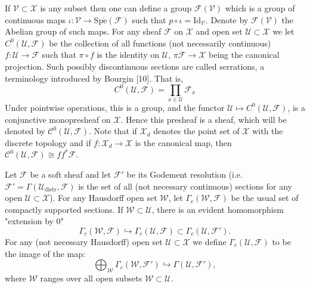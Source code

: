 \documentclass{beamer}
\theoremstyle{plain}
\newcommand{\be}{\begin{equation}}
\newcommand{\ee}{\end{equation}}
\newcommand{\Ga}{\Gamma}
\newcommand{\Id}{\mathrm{Id}}
\newcommand{\F}{\mathcal{F}}
\newcommand{\sF}{\mathcal{F}}       %
\newcommand{\sU}{\mathcal{U}}       %
\newcommand{\sV}{\mathcal{V}}       %
\newcommand{\sX}{\mathcal{X}}       %
\newcommand{\hookto}{\hookrightarrow}        %
\begin{document}
\begin{frame}
	If $\sV \subset \sX$ is any subset  then  one can define a group $\mathscr F\left(\sV\right)$  which is a group of continuous maps  $\iota :\sV\to \mathrm{Sp\acute{e}}\left(\mathscr F \right)$ such that $p\circ\iota = \Id_\sV$. Denote by  $\mathscr F\left(\sV \right)$ the Abelian group of such maps.
		For any sheaf $\F$ on $\sX$ and open set $\sU \subset \sX$ we let $C^0\left(\sU, \sF \right)$  be the
	collection of all functions (not necessarily continuous) $f: \sU \to \F$ such
	that $\pi\circ f$ is the identity on $\sU$, $\pi \sF \to \sX$ being the canonical projection.
	Such possibly discontinuous sections are called serrations, a terminology
	introduced by Bourgin [10]. That is,
	$$
	C^0\left(\sU, \sF \right) = \prod_{x \in \sU} \F_x
	$$
	Under pointwise operations, this is a group, and the functor $\sU \mapsto 	C^0\left(\sU, \sF \right)$,
	is a conjunctive monopresheaf on $\sX$. Hence this presheaf is a sheaf, which
	will be denoted by 	$\mathscr C^0\left(\sU, \sF \right)$. Note that if $\sX_d$ denotes the point set of $\sX$
	with the discrete topology and if $f : \sX_d \to \sX$ is the canonical map, then
	$\mathscr C^0\left(\sU, \sF \right)\cong ff^*\F$.
\end{frame}
\begin{frame}
\begin{definition}\label{nh_csoft_gc_defn}\cite{cra_moe:nhaus}
	Let $\mathscr{F}$ be a soft sheaf  and let $\mathscr{F}'$  be its Godement resolution (i.e. $\mathscr{F}'= \Ga\left(\sU_{\text{distr}}, \mathscr{F} \right)$ is the set of all (not necessary continuous) sections for any open $\sU \subset \sX$). For any Hausdorff open set $\mathcal W$, let $\Ga_c\left(\mathcal W, \mathscr{F} \right)$ be the usual set of compactly supported sections. If $\mathcal W \subset \sU$, there is an evident homomorphism "extension by 0" 
	\be\label{sheaf_inc_eqn}
	\Ga_c\left(\mathcal W, \mathscr{F} \right) \hookto \Ga_c\left(\mathcal U, \mathscr{F} \right)\subset \Ga_c\left(\mathcal U, \mathscr{F}' \right).
	\ee
	For any (not necessary Hausdorff) open set $\sU \subset \sX$ we define $\Ga_c \left(\sU, \mathscr{F} \right)$ to be the image of the map:
	$$
	\bigoplus_{\mathcal W} \Ga_c\left(\mathcal W, \mathscr{F}' \right) \hookto \Ga\left(\mathcal U, \mathscr{F}' \right),
	$$ 
	where $\mathcal W$ ranges over  all open subsets $\mathcal W \subset \mathcal U$. %
\end{definition}
\end{frame}
\end{document}
